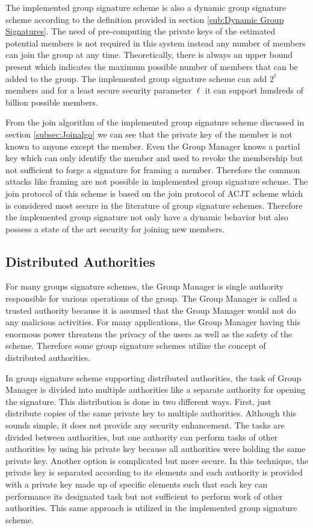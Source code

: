 The implemented group signature scheme is also a dynamic group signature scheme according to the definition provided in section \ref{sub:Dynamic Group Signatures}. The need of pre-computing the private keys of the estimated potential members is not required in this system instead any number of members can join the group at any time. Theoretically, there is always an upper bound present which indicates the maximum possible number of members that can be added to the group. The implemented group signature scheme can add $2^\ell$ members and for a least secure security parameter $\ell$ it can support hundreds of billion possible members. 

From the join algorithm of the implemented group signature scheme discussed in section \ref{subsec:Joinalgo} we can see that the private key of the member is not known to anyone except the member. Even the Group Manager knows a partial key which can only identify the member and used to revoke the membership but not sufficient to forge a signature for framing a member. Therefore the common attacks like framing are not possible in implemented group signature scheme. The join protocol of this scheme is based on the join protocol of ACJT scheme which is considered most secure in the literature of group signature schemes. Therefore the implemented group signature not only have a dynamic behavior but also possess a state of the art security for joining new members. 

\subsection{Distributed Authorities}
For many groups signature schemes, the Group Manager is single authority responsible for various operations of the group. The Group Manager is called a trusted authority because it is assumed that the Group Manager would not do any malicious activities. For many applications, the Group Manager having this enormous power threatens the privacy of the users as well as the safety of the scheme. Therefore some group signature schemes utilize the concept of distributed authorities.

In group signature scheme supporting distributed authorities, the task of Group Manager is divided into multiple authorities like a separate authority for opening the signature. This distribution is done in two different ways. First, just distribute copies of the same private key to multiple authorities. Although this sounds simple, it does not provide any security enhancement. The tasks are divided between authorities, but one authority can perform tasks of other authorities by using his private key because all authorities were holding the same private key. Another option is complicated but more secure. In this technique, the private key is separated according to its elements and each authority is provided with a private key made up of specific elements such that each key can performance its designated task but not sufficient to perform work of other authorities. This same approach is utilized in the implemented group signature scheme.

